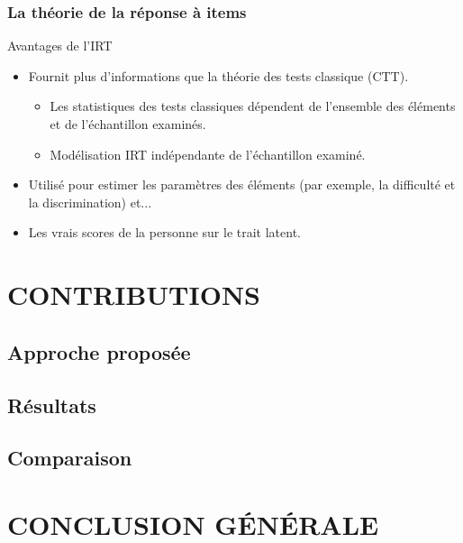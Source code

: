 \documentclass[aspectratio=169,professionalfonts, 12pt]{beamer}
\begin{document}
\begin{frame}
  \frametitle{La théorie de la réponse à items}
  \justifying 
  \begin{minipage}{\textwidth}
  \begin{block}{Avantages de l'IRT}
    \begin{itemize}
      \item	Fournit plus d'informations que la théorie des tests classique (CTT).
      \begin{itemize}
        \item Les statistiques des tests classiques dépendent de l'ensemble des éléments et de l'échantillon examinés.
        \item	Modélisation IRT indépendante de l'échantillon examiné.
      \end{itemize}
      \item Utilisé pour estimer les paramètres des éléments (par exemple, la difficulté et la discrimination) et...
      \item Les vrais scores de la personne sur le trait latent.
    \end{itemize}
  \end{block}  
  \end{minipage} 
\end{frame}

\section{CONTRIBUTIONS}

\subsection{Approche proposée}

\subsection{Résultats}

\subsection{Comparaison}

\section{CONCLUSION G\'EN\'ERALE}
\end{document}
